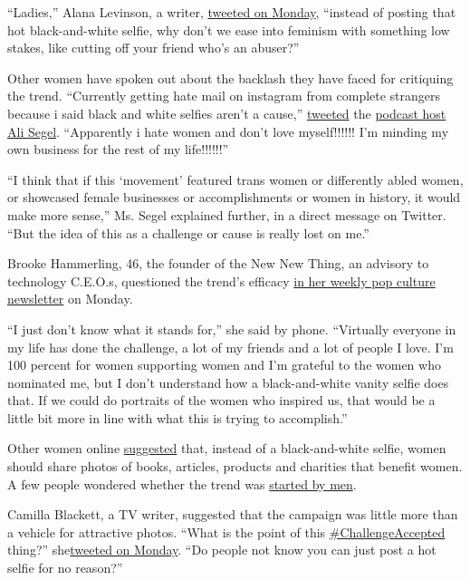 ``Ladies,'' Alana Levinson, a writer,
\href{https://twitter.com/alanalevinson/status/1287818379818971136}{tweeted
on Monday}, ``instead of posting that hot black-and-white selfie, why
don't we ease into feminism with something low stakes, like cutting off
your friend who's an abuser?''

Other women have spoken out about the backlash they have faced for
critiquing the trend. ``Currently getting hate mail on instagram from
complete strangers because i said black and white selfies aren't a
cause,''
\href{https://twitter.com/OnlineAlison/status/1287804859773677568}{tweeted}
the \href{https://www.instagram.com/p/CDJw9mpgqc1/}{podcast host Ali
Segel}. ``Apparently i hate women and don't love myself!!!!!! I'm
minding my own business for the rest of my life!!!!!!''

``I think that if this `movement' featured trans women or differently
abled women, or showcased female businesses or accomplishments or women
in history, it would make more sense,'' Ms. Segel explained further, in
a direct message on Twitter. ``But the idea of this as a challenge or
cause is really lost on me.''

Brooke Hammerling, 46, the founder of the New New Thing, an advisory to
technology C.E.O.s, questioned the trend's efficacy
\href{https://medium.com/popculturemondays/pop-culture-mondays-7-20-20-3d2276f3c16}{in
her weekly pop culture newsletter} on Monday.

``I just don't know what it stands for,'' she said by phone. ``Virtually
everyone in my life has done the challenge, a lot of my friends and a
lot of people I love. I'm 100 percent for women supporting women and I'm
grateful to the women who nominated me, but I don't understand how a
black-and-white vanity selfie does that. If we could do portraits of the
women who inspired us, that would be a little bit more in line with what
this is trying to accomplish.''

Other women online
\href{https://twitter.com/itsbooyeah/status/1287807365614534661}{suggested}
that, instead of a black-and-white selfie, women should share photos of
books, articles, products and charities that benefit women. A few people
wondered whether the trend was
\href{https://twitter.com/wolfiecomedy/status/1287813475096387584}{started
by men}.

Camilla Blackett, a TV writer, suggested that the campaign was little
more than a vehicle for attractive photos. ``What is the point of this
\href{https://twitter.com/hashtag/ChallengeAccepted?src=hashtag_click}{\#ChallengeAccepted}
thing?''
she\href{https://twitter.com/camillard/status/1287768130140246022}{tweeted
on Monday}. ``Do people not know you can just post a hot selfie for no
reason?''

